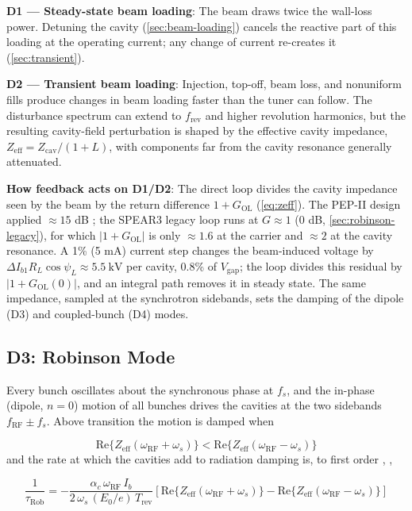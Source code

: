 \textbf{D1 --- Steady-state beam loading}: The beam draws twice the wall-loss power. Detuning the cavity (\cref{sec:beam-loading}) cancels the reactive part of this loading at the operating current; any change of current re-creates it (\cref{sec:transient}). 

\textbf{D2 --- Transient beam loading}: Injection, top-off, beam loss, and nonuniform fills produce changes in beam loading faster than the tuner can follow. The disturbance spectrum can extend to \(f_{\mathrm{rev}}\) and higher revolution harmonics, but the resulting cavity-field perturbation is shaped by the effective cavity impedance, \(Z_{\mathrm{eff}}=Z_{\mathrm{cav}}/(1+L)\), with components far from the cavity resonance generally attenuated.

\textbf{How feedback acts on D1/D2}: The direct loop divides the cavity impedance seen by the beam by the return difference \(1 + G_\text{OL}\) (\cref{eq:zeff}). The PEP-II design applied \(\approx 15\) dB ; the SPEAR3 legacy loop runs at \(G \approx 1\) (0 dB, \cref{sec:robinson-legacy}), for which \(\lvert 1 + G_\text{OL}\rvert\) is only \(\approx 1.6\) at the carrier and \(\approx 2\) at the cavity resonance. A 1\% (5 mA) current step changes the beam-induced voltage by \(\Delta I_{b1} R_L \cos\psi_L \approx \qty{5.5}{\kilo\volt}\) per cavity, 0.8\% of \(V_\text{gap}\); the loop divides this residual by \(\lvert 1 + G_\text{OL}(0)\rvert\), and an integral path removes it in steady state. The same impedance, sampled at the synchrotron sidebands, sets the damping of the dipole (D3) and coupled-bunch (D4) modes.

\subsection{D3: Robinson Mode}\label{sec:d3}


Every bunch oscillates about the synchronous phase at \(f_s\), and the in-phase (dipole, \(n = 0\)) motion of all bunches drives the cavities at the two sidebands \(f_\text{RF} \pm f_s\). Above transition the motion is damped when

\begin{equation}\label{eq:robinson-crit}
\text{Re}\{Z_\text{eff}(\omega_\text{RF} + \omega_s)\} < \text{Re}\{Z_\text{eff}(\omega_\text{RF} - \omega_s)\}
\end{equation}
and the rate at which the cavities add to radiation damping is, to first order , ,

\begin{equation}\label{eq:robinson-rate}
\frac{1}{\tau_\text{Rob}} = -\frac{\alpha_c\,\omega_\text{RF}\,I_b}{2\,\omega_s\,(E_0/e)\,T_\text{rev}} \left[\text{Re}\{Z_\text{eff}(\omega_\text{RF} + \omega_s)\} - \text{Re}\{Z_\text{eff}(\omega_\text{RF} - \omega_s)\}\right]
\end{equation}

